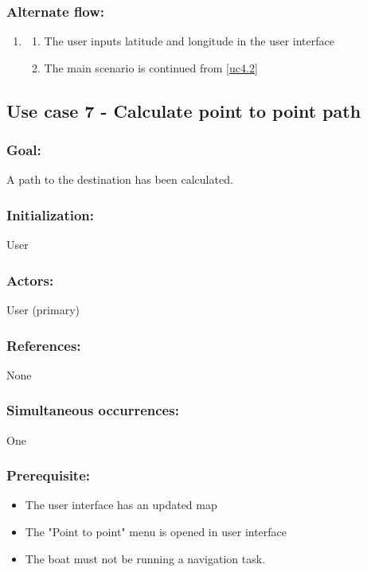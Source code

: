 \begin{framed}
	\subsubsection*{Alternate flow:}
	\begin{enumerate}
		\item 
		\begin{enumerate}
			\item The user inputs latitude and longitude in the user interface
			\item The main scenario is continued from \ref{uc4.2}
		\end{enumerate}
	\end{enumerate}
\end{framed}	

\begin{framed}
	\subsection{Use case 7 - Calculate point to point path}
	\subsubsection*{Goal:}
	A path to the destination has been calculated.
	
	\subsubsection*{Initialization:}
	User
	
	\subsubsection*{Actors:}
	User (primary)
	
	\subsubsection*{References:}
	None
	
	\subsubsection*{Simultaneous occurrences:}
	One 
	
	\subsubsection*{Prerequisite:}
	\begin{itemize}
		\item The user interface has an updated map
		\item The "Point to point" menu is opened in user interface
		\item The boat must not be running a navigation task.
	\end{itemize}
	

\end{framed}
